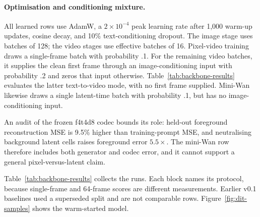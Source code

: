 \documentclass[10pt,twocolumn]{article}
\begin{document}
\paragraph{Optimisation and conditioning mixture.} All learned rows use AdamW, a $2\times10^{-4}$ peak
learning rate after 1{,}000 warm-up updates, cosine decay, and 10\% text-conditioning dropout. The image
stage uses batches of 128; the video stages use effective batches of 16. Pixel-video training draws a
single-frame batch with probability .1. For the remaining video batches, it supplies the clean first frame
through an image-conditioning input with probability .2 and zeros that input otherwise. Table~\ref{tab:backbone-results}
evaluates the latter text-to-video mode, with no first frame supplied. Mini-Wan likewise draws a single
latent-time batch with probability .1, but has no image-conditioning input.

An audit of the frozen f4t4d8 codec bounds its role: held-out foreground reconstruction MSE is 9.5\% higher
than training-prompt MSE, and neutralising background latent cells raises foreground error $5.5\times$. The
mini-Wan row therefore includes both generator and codec error, and it cannot support a general
pixel-versus-latent claim.

Table~\ref{tab:backbone-results} collects the runs. Each block names its protocol, because single-frame and
64-frame scores are different measurements. Earlier v0.1 baselines used a superseded split and are not
comparable rows. Figure~\ref{fig:dit-samples} shows the warm-started model.
\end{document}
